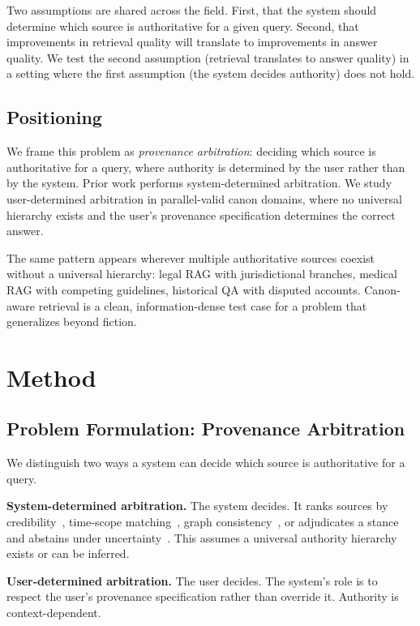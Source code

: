 \documentclass[conference]{IEEEtran}
\begin{document}
Two assumptions are shared across the field. First, that the system should determine which source is authoritative for a given query. Second, that improvements in retrieval quality will translate to improvements in answer quality. We test the second assumption (retrieval translates to answer quality) in a setting where the first assumption (the system decides authority) does not hold.

\subsection{Positioning}

We frame this problem as \emph{provenance arbitration}: deciding which source is authoritative for a query, where authority is determined by the user rather than by the system. Prior work performs system-determined arbitration. We study user-determined arbitration in parallel-valid canon domains, where no universal hierarchy exists and the user's provenance specification determines the correct answer.

The same pattern appears wherever multiple authoritative sources coexist without a universal hierarchy: legal RAG with jurisdictional branches, medical RAG with competing guidelines, historical QA with disputed accounts. Canon-aware retrieval is a clean, information-dense test case for a problem that generalizes beyond fiction.

\section{Method}

\subsection{Problem Formulation: Provenance Arbitration}

We distinguish two ways a system can decide which source is authoritative for a query.

\textbf{System-determined arbitration.} The system decides. It ranks sources by credibility~\cite{conflictrag,confact}, time-scope matching~\cite{tgrag}, graph consistency~\cite{truthfulrag}, or adjudicates a stance and abstains under uncertainty~\cite{conrag}. This assumes a universal authority hierarchy exists or can be inferred.

\textbf{User-determined arbitration.} The user decides. The system's role is to respect the user's provenance specification rather than override it. Authority is context-dependent.
\end{document}
